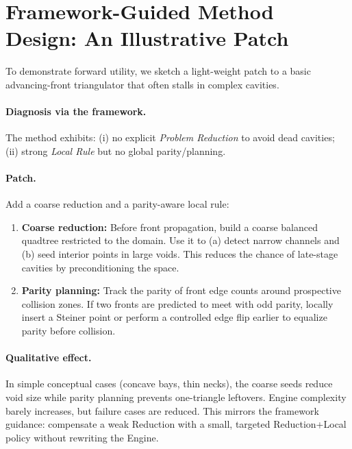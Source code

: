 \section{Framework-Guided Method Design: An Illustrative Patch}
To demonstrate forward utility, we sketch a light-weight patch to a basic advancing-front triangulator that often stalls in complex cavities.

\paragraph{Diagnosis via the framework.} The method exhibits: (i) no explicit \emph{Problem Reduction} to avoid dead cavities; (ii) strong \emph{Local Rule} but no global parity/planning.

\paragraph{Patch.} Add a coarse reduction and a parity-aware local rule:
\begin{enumerate}
  \item \textbf{Coarse reduction:} Before front propagation, build a coarse balanced quadtree restricted to the domain. Use it to (a) detect narrow channels and (b) seed interior points in large voids. This reduces the chance of late-stage cavities by preconditioning the space.
  \item \textbf{Parity planning:} Track the parity of front edge counts around prospective collision zones. If two fronts are predicted to meet with odd parity, locally insert a Steiner point or perform a controlled edge flip earlier to equalize parity before collision.
\end{enumerate}

\paragraph{Qualitative effect.} In simple conceptual cases (concave bays, thin necks), the coarse seeds reduce void size while parity planning prevents one-triangle leftovers. Engine complexity barely increases, but failure cases are reduced. This mirrors the framework guidance: compensate a weak Reduction with a small, targeted Reduction+Local policy without rewriting the Engine.
